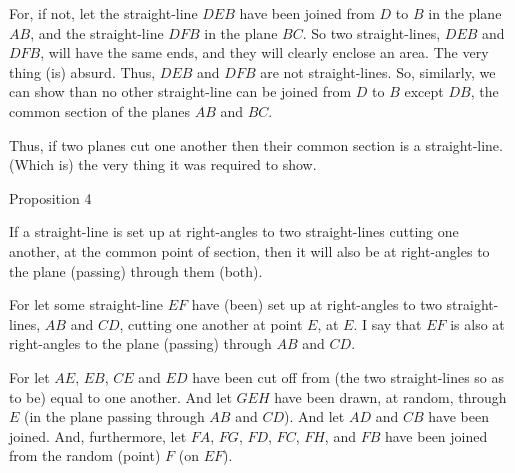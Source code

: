 For, if not,  let the straight-line $DEB$ have been joined from $D$ to $B$
in the plane $AB$, and the straight-line $DFB$ in the plane $BC$. 
So two straight-lines, $DEB$ and $DFB$, will have the same ends, and
they will clearly enclose an area. The very thing (is) absurd. Thus,
$DEB$ and $DFB$ are not straight-lines.  So, similarly, we can show
than no other straight-line  can be joined from $D$ to $B$  except $DB$, the common section of the planes $AB$ and $BC$.

Thus, if  two planes cut one another then their common
section is a straight-line. (Which is) the very thing it was required to
show.~\\


\begin{center}
{\large Proposition 4}
\end{center}

If a straight-line is set up at right-angles to two straight-lines cutting one another, at the common  point of section,  then it will also be
at right-angles to the plane (passing) through them (both).

\centerline{}

For let some straight-line $EF$ have (been) set up  at right-angles to two
straight-lines, $AB$ and $CD$, cutting one another at point $E$, at $E$. I say that
$EF$ is also at right-angles to the plane (passing) through $AB$ and $CD$.

For let $AE$, $EB$, $CE$ and $ED$ have been cut off from (the two straight-lines
so as to be) equal to one another. And let $GEH$ have been drawn, at random,
through $E$ (in the plane passing through $AB$ and $CD$). And let $AD$ and $CB$ have been joined. And, furthermore,
let $FA$, $FG$, $FD$, $FC$, $FH$, and $FB$ have been joined
from the random (point) $F$ (on $EF$).

